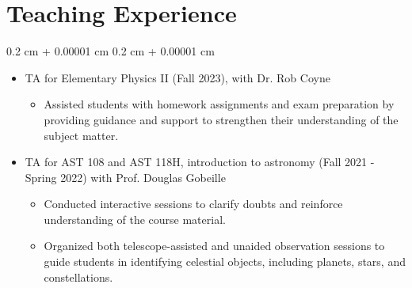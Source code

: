 \documentclass[10pt, letterpaper]{article}
\newenvironment{highlightsforbulletentries}{
    \begin{itemize}[
        topsep=0.10 cm,
        parsep=0.10 cm,
        partopsep=0pt,
        itemsep=0pt,
        leftmargin=10pt
    ]
}{
    \end{itemize}
}
\newenvironment{onecolentry}{
    \begin{adjustwidth}{
        0.2 cm + 0.00001 cm
    }{
        0.2 cm + 0.00001 cm
    }
}{
    \end{adjustwidth}
}
\begin{document}
\section{Teaching Experience}
\begin{onecolentry}
    \begin{highlightsforbulletentries}
      \item TA for Elementary Physics II (Fall 2023), with Dr. Rob Coyne
      \begin{itemize}
        \item Assisted students with homework assignments and exam preparation by providing guidance and support to strengthen their understanding of the subject matter.
      \end{itemize}

      \item TA for AST 108 and AST 118H, introduction to astronomy (Fall 2021 - Spring 2022) with Prof. Douglas Gobeille
      \begin{itemize}
        \item Conducted interactive sessions to clarify doubts and reinforce understanding of the course material.
        \item Organized both telescope-assisted and unaided observation sessions to guide students in identifying celestial objects, 
        including planets, stars, and constellations.
      \end{itemize}   
    \end{highlightsforbulletentries}
\end{onecolentry}

\vspace{0.2 cm}

\end{document}
